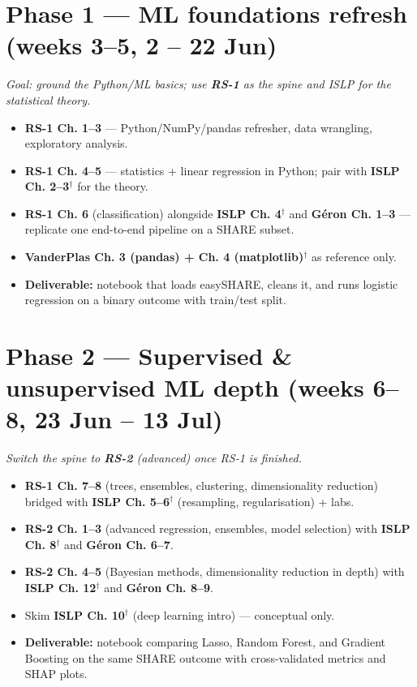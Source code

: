 \documentclass[11pt,a4paper]{article}
\begin{document}
\section{Phase 1 --- ML foundations refresh (weeks 3--5, 2 -- 22 Jun)}
\textit{Goal: ground the Python/ML basics; use \textbf{RS-1} as the spine and ISLP for the statistical theory.}
\begin{itemize}
  \item \textbf{RS-1 Ch. 1--3} --- Python/NumPy/pandas refresher, data wrangling, exploratory analysis.
  \item \textbf{RS-1 Ch. 4--5} --- statistics + linear regression in Python; pair with \textbf{ISLP Ch. 2--3}$^\dagger$ for the theory.
  \item \textbf{RS-1 Ch. 6} (classification) alongside \textbf{ISLP Ch. 4}$^\dagger$ and \textbf{G\'eron Ch. 1--3} --- replicate one end-to-end pipeline on a SHARE subset.
  \item \textbf{VanderPlas Ch. 3 (pandas) + Ch. 4 (matplotlib)}$^\dagger$ as reference only.
  \item \textbf{Deliverable:} notebook that loads easySHARE, cleans it, and runs logistic regression on a binary outcome with train/test split.
\end{itemize}

\section{Phase 2 --- Supervised \& unsupervised ML depth (weeks 6--8, 23 Jun -- 13 Jul)}
\textit{Switch the spine to \textbf{RS-2} (advanced) once RS-1 is finished.}
\begin{itemize}
  \item \textbf{RS-1 Ch. 7--8} (trees, ensembles, clustering, dimensionality reduction) bridged with \textbf{ISLP Ch. 5--6}$^\dagger$ (resampling, regularisation) + labs.
  \item \textbf{RS-2 Ch. 1--3} (advanced regression, ensembles, model selection) with \textbf{ISLP Ch. 8}$^\dagger$ and \textbf{G\'eron Ch. 6--7}.
  \item \textbf{RS-2 Ch. 4--5} (Bayesian methods, dimensionality reduction in depth) with \textbf{ISLP Ch. 12}$^\dagger$ and \textbf{G\'eron Ch. 8--9}.
  \item Skim \textbf{ISLP Ch. 10}$^\dagger$ (deep learning intro) --- conceptual only.
  \item \textbf{Deliverable:} notebook comparing Lasso, Random Forest, and Gradient Boosting on the same SHARE outcome with cross-validated metrics and SHAP plots.
\end{itemize}
\end{document}
